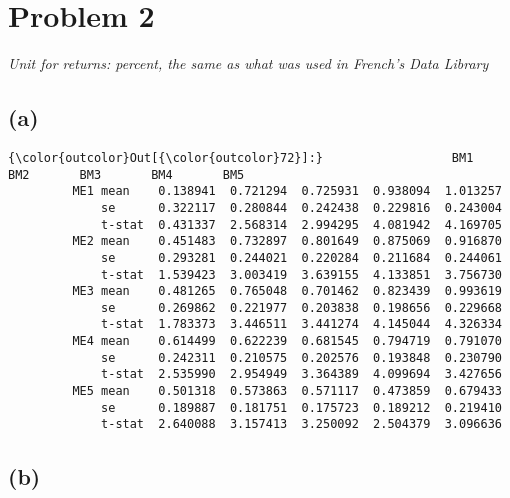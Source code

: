 \documentclass[10pt]{article}
\begin{document}
    


    \section{Problem 2}\label{problem-2}
\emph{Unit for returns: percent, the same as what was used in French’s Data Library}
\subsection{(a)}\label{a}


            \begin{Verbatim}[commandchars=\\\{\}]
{\color{outcolor}Out[{\color{outcolor}72}]:}                  BM1       BM2       BM3       BM4       BM5
         ME1 mean    0.138941  0.721294  0.725931  0.938094  1.013257
             se      0.322117  0.280844  0.242438  0.229816  0.243004
             t-stat  0.431337  2.568314  2.994295  4.081942  4.169705
         ME2 mean    0.451483  0.732897  0.801649  0.875069  0.916870
             se      0.293281  0.244021  0.220284  0.211684  0.244061
             t-stat  1.539423  3.003419  3.639155  4.133851  3.756730
         ME3 mean    0.481265  0.765048  0.701462  0.823439  0.993619
             se      0.269862  0.221977  0.203838  0.198656  0.229668
             t-stat  1.783373  3.446511  3.441274  4.145044  4.326334
         ME4 mean    0.614499  0.622239  0.681545  0.794719  0.791070
             se      0.242311  0.210575  0.202576  0.193848  0.230790
             t-stat  2.535990  2.954949  3.364389  4.099694  3.427656
         ME5 mean    0.501318  0.573863  0.571117  0.473859  0.679433
             se      0.189887  0.181751  0.175723  0.189212  0.219410
             t-stat  2.640088  3.157413  3.250092  2.504379  3.096636
\end{Verbatim}
        
    \subsection{(b)}\label{b}


    \begin{center}
    \end{center}
    
\end{document}
